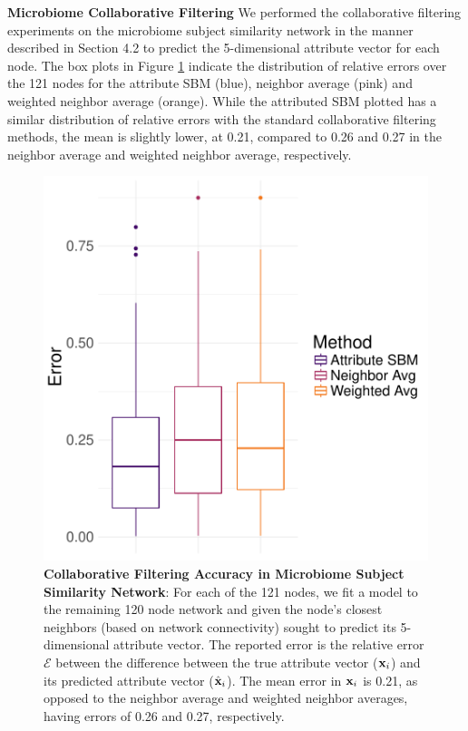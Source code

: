 {\bf Microbiome Collaborative Filtering}
We performed the collaborative filtering experiments on the microbiome subject similarity network in the manner described in Section 4.2 to predict the 5-dimensional attribute vector for each node. The box plots in Figure \ref{Fig6} indicate the distribution of relative errors over the 121 nodes for the attribute SBM (blue), neighbor average (pink) and weighted neighbor average (orange). While the attributed SBM plotted has a similar distribution of relative errors with the standard collaborative filtering methods, the mean is slightly lower, at 0.21, compared to 0.26 and 0.27 in the neighbor average and weighted neighbor average, respectively.
\begin{figure}[h!]
\begin{center}
\includegraphics[width=.5\textwidth]{CollabFilterMicro.pdf}
\caption{{\bf Collaborative Filtering Accuracy in Microbiome Subject Similarity Network}: For each of the 121 nodes, we fit a model to the remaining 120 node network and given the node's closest  neighbors (based on network connectivity) sought to predict its 5-dimensional attribute vector. The reported error is the relative error $\mathcal{E}$ between the difference between the true attribute vector (${\bf x}_{i}$) and its predicted attribute vector (${\hat{\bf x}}_{i}$). The mean error in ${\bf x}_{i}$ is 0.21, as opposed to the neighbor average and weighted neighbor averages, having errors of 0.26 and 0.27, respectively. }
\label{Fig6}
\end{center}
\end{figure}


